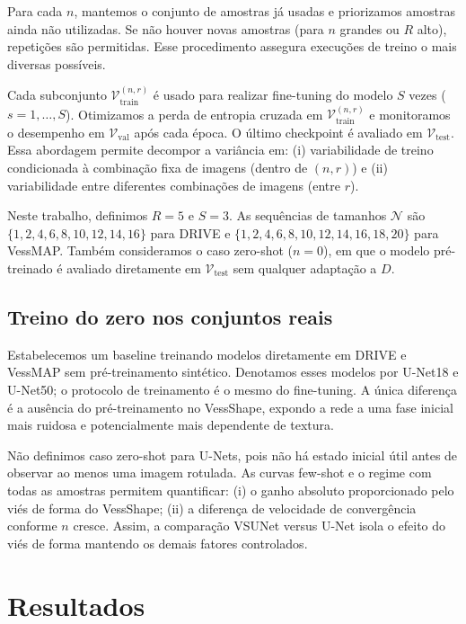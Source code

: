 \documentclass[%
reprint,
nofootinbib,
 amsmath,amssymb,
aps,
floatfix,
superscriptaddress,
showkeys,
longbibliography
]{revtex4-1}
\begin{document}
Para cada $n$, mantemos o conjunto de amostras já usadas e priorizamos amostras ainda não utilizadas. Se não houver novas amostras (para $n$ grandes ou $R$ alto), repetições são permitidas. Esse procedimento assegura execuções de treino o mais diversas possíveis.

Cada subconjunto $\mathcal{V}^{(n,r)}_{\text{train}}$ é usado para realizar fine-tuning do modelo $S$ vezes ($s=1,\ldots,S$). Otimizamos a perda de entropia cruzada em $\mathcal{V}^{(n,r)}_{\text{train}}$ e monitoramos o desempenho em $\mathcal{V}_{\text{val}}$ após cada época. O último checkpoint é avaliado em $\mathcal{V}_{\text{test}}$. Essa abordagem permite decompor a variância em: (i) variabilidade de treino condicionada à combinação fixa de imagens (dentro de $(n,r)$) e (ii) variabilidade entre diferentes combinações de imagens (entre $r$).

Neste trabalho, definimos $R=5$ e $S=3$. As sequências de tamanhos $\mathcal{N}$ são $\{1,2,4,6,8,10, 12, 14, 16\}$ para DRIVE e $\{1,2,4,6,8,10, 12, 14, 16,18,20\}$ para VessMAP. Também consideramos o caso zero-shot ($n=0$), em que o modelo pré-treinado é avaliado diretamente em $\mathcal{V}_{\text{test}}$ sem qualquer adaptação a $D$. 


\subsection{Treino do zero nos conjuntos reais}

Estabelecemos um baseline treinando modelos diretamente em DRIVE e VessMAP sem pré-treinamento sintético. Denotamos esses modelos por U-Net18 e U-Net50; o protocolo de treinamento é o mesmo do fine-tuning. A única diferença é a ausência do pré-treinamento no VessShape, expondo a rede a uma fase inicial mais ruidosa e potencialmente mais dependente de textura.

Não definimos caso zero-shot para U-Nets, pois não há estado inicial útil antes de observar ao menos uma imagem rotulada. As curvas few-shot e o regime com todas as amostras permitem quantificar: (i) o ganho absoluto proporcionado pelo viés de forma do VessShape; (ii) a diferença de velocidade de convergência conforme $n$ cresce. Assim, a comparação VSUNet versus U-Net isola o efeito do viés de forma mantendo os demais fatores controlados.


\section{Resultados}
\label{s:results}
\end{document}
